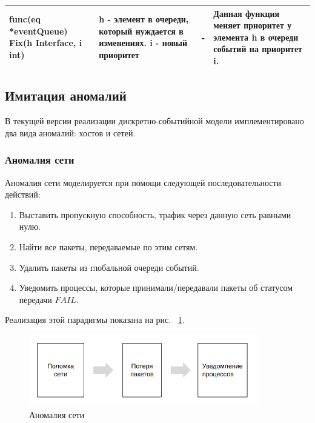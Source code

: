 \begin{table}[]
\begin{tabularx}{\textwidth}{|X|X|X|X|}
func(eq *eventQueue) Fix(h Interface, i int) & h - элемент в очереди, который нуждается в изменениях. i - новый приоритет & -                                               & Данная функция меняет приоритет у элемента h в очереди событий на приоритет i.                                                                                                                                           \\ \hline
\end{tabularx}
\end{table}

\subsection{Имитация аномалий}

В текущей версии реализации дискретно-событийной модели имплементировано два вида аномалий: хостов и сетей. 

\subsubsection{Аномалия сети}

Аномалия сети моделируется при помощи следующей последовательности действий:

\begin{enumerate}
\item Выставить пропускную способность, трафик через данную сеть равными нулю.
\item Найти все пакеты, передаваемые по этим сетям. 
\item Удалить пакеты из глобальной очереди событий. 
\item Уведомить процессы, которые принимали/передавали пакеты об статусом передачи $FAIL$.
\end{enumerate}

Реализация этой парадигмы показана на рис. ~\ref{fig:anom-link}.

\begin{figure}[!ht]
\centering
\includegraphics[width=10cm]{Kenenbek/images/anom-scheme-link.png}
\caption{Аномалия сети}
\label{fig:anom-link}
\end{figure}


